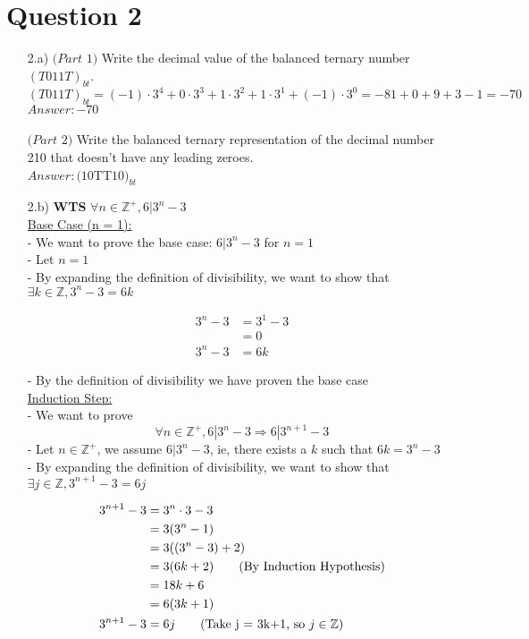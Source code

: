 \documentclass[20pt]{article}
\begin{document}
\section*{Question 2}
\begin{enumerate}

\item[2.a)] $(Part$ $1)$ Write the decimal value of the balanced ternary number $(T011T)_{bt}$.\\
\[(T011T)_{bt} = (-1)\cdot3^4 + 0\cdot3^3 + 1\cdot3^2 + 1\cdot3^1 + (-1)\cdot3^0 = -81 + 0 + 9 + 3 - 1 = -70\]
$Answer: -70$\\\\
$(Part$ $2)$ Write the balanced ternary representation of the decimal number 210 that doesn’t have any
leading zeroes.\\
$Answer: (10$TT$10)_{bt}$


\item[2.b)] \textbf{WTS} $\forall n\in\mathbb{Z}^+,6|3^n-3$\\

\underline{Base Case (n = 1):}\\
- We want to prove the base case: $6|3^n-3$ for $n = 1$\\
- Let $n = 1$\\
- By expanding the definition of divisibility, we want to show that $\exists k \in\mathbb{Z}, 3^n-3 = 6k$

\begin{align*}
    3^n-3 &= 3^1-3\nonumber\\
    &= 0\\
    3^n-3 &= 6k \tag{Take k = 0}\nonumber
\end{align*}

- By the definition of divisibility we have proven the base case\\

\underline{Induction Step:}\\
- We want to prove 
\[\forall n\in\mathbb{Z}^+,6|3^n-3 \Rightarrow 6|3^{n + 1}-3\]
- Let $n \in \mathbb{Z^+}$, we assume $6|3^{n}-3$, ie, there exists a $k$ such that  $6k = 3^n-3$\\
- By expanding the definition of divisibility, we want to show that $\exists j \in\mathbb{Z}, 3^{n+1}-3 = 6j$

\begin{align*}
    3^{n+1}-3 &= 3^n\cdot3- 3 \nonumber\\
    &= 3(3^n-1) \nonumber\\
    &= 3((3^n - 3) + 2)\nonumber\\
    &= 3(6k + 2)\tag{By Induction Hypothesis}\\
    &= 18k+6\nonumber\\
    &= 6(3k+1)\nonumber\\
    3^{n+1}-3 &= 6j\nonumber\tag{Take j = 3k+1, so $j \in \mathbb{Z}$}
\end{align*}


\end{enumerate}
\end{document}
